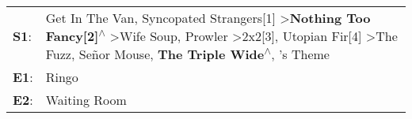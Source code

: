 \begin{supertabular}{p{0.03\textwidth}p{0.92\textwidth}}
 \textbf{S1}:  &  Get In The Van\textsuperscript{}, \enspace Syncopated Strangers[1]\textsuperscript{} \textgreater \enspace \textbf{Nothing Too Fancy[2]\textsuperscript{$\wedge$}} \textgreater \enspace Wife Soup\textsuperscript{}, \enspace Prowler\textsuperscript{} \textgreater \enspace 2x2[3]\textsuperscript{}, \enspace Utopian Fir[4]\textsuperscript{} \textgreater \enspace The Fuzz\textsuperscript{}, \enspace Señor Mouse\textsuperscript{}, \enspace \textbf{The Triple Wide\textsuperscript{$\wedge$}}, 's Theme\textsuperscript{}  \enspace  \\
 \textbf{E1}:  &                                                                                                                                                                                                                                                                                                                                                                                                                                                                                                                          Ringo\textsuperscript{}  \enspace  \\
 \textbf{E2}:  &                                                                                                                                                                                                                                                                                                                                                                                                                                                                                                                   Waiting Room\textsuperscript{}  \enspace  \\
\end{supertabular}
